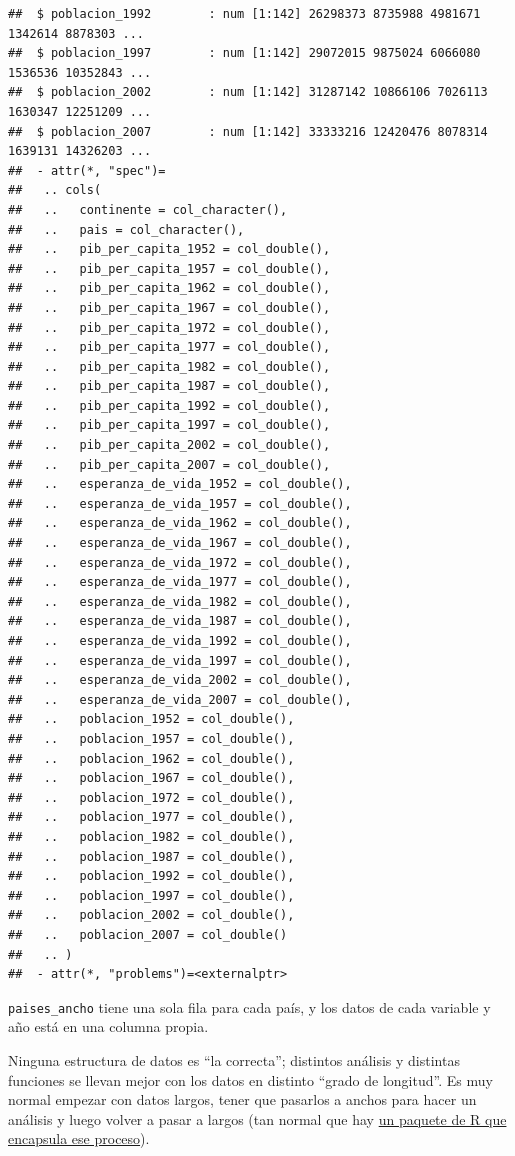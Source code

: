 \documentclass[
  openany]{book}
\begin{document}
\begin{verbatim}
##  $ poblacion_1992        : num [1:142] 26298373 8735988 4981671 1342614 8878303 ...
##  $ poblacion_1997        : num [1:142] 29072015 9875024 6066080 1536536 10352843 ...
##  $ poblacion_2002        : num [1:142] 31287142 10866106 7026113 1630347 12251209 ...
##  $ poblacion_2007        : num [1:142] 33333216 12420476 8078314 1639131 14326203 ...
##  - attr(*, "spec")=
##   .. cols(
##   ..   continente = col_character(),
##   ..   pais = col_character(),
##   ..   pib_per_capita_1952 = col_double(),
##   ..   pib_per_capita_1957 = col_double(),
##   ..   pib_per_capita_1962 = col_double(),
##   ..   pib_per_capita_1967 = col_double(),
##   ..   pib_per_capita_1972 = col_double(),
##   ..   pib_per_capita_1977 = col_double(),
##   ..   pib_per_capita_1982 = col_double(),
##   ..   pib_per_capita_1987 = col_double(),
##   ..   pib_per_capita_1992 = col_double(),
##   ..   pib_per_capita_1997 = col_double(),
##   ..   pib_per_capita_2002 = col_double(),
##   ..   pib_per_capita_2007 = col_double(),
##   ..   esperanza_de_vida_1952 = col_double(),
##   ..   esperanza_de_vida_1957 = col_double(),
##   ..   esperanza_de_vida_1962 = col_double(),
##   ..   esperanza_de_vida_1967 = col_double(),
##   ..   esperanza_de_vida_1972 = col_double(),
##   ..   esperanza_de_vida_1977 = col_double(),
##   ..   esperanza_de_vida_1982 = col_double(),
##   ..   esperanza_de_vida_1987 = col_double(),
##   ..   esperanza_de_vida_1992 = col_double(),
##   ..   esperanza_de_vida_1997 = col_double(),
##   ..   esperanza_de_vida_2002 = col_double(),
##   ..   esperanza_de_vida_2007 = col_double(),
##   ..   poblacion_1952 = col_double(),
##   ..   poblacion_1957 = col_double(),
##   ..   poblacion_1962 = col_double(),
##   ..   poblacion_1967 = col_double(),
##   ..   poblacion_1972 = col_double(),
##   ..   poblacion_1977 = col_double(),
##   ..   poblacion_1982 = col_double(),
##   ..   poblacion_1987 = col_double(),
##   ..   poblacion_1992 = col_double(),
##   ..   poblacion_1997 = col_double(),
##   ..   poblacion_2002 = col_double(),
##   ..   poblacion_2007 = col_double()
##   .. )
##  - attr(*, "problems")=<externalptr>
\end{verbatim}

\texttt{paises\_ancho} tiene una sola fila para cada país, y los datos de cada variable y año está en una columna propia.

Ninguna estructura de datos es ``la correcta''; distintos análisis y distintas funciones se llevan mejor con los datos en distinto ``grado de longitud''.
Es muy normal empezar con datos largos, tener que pasarlos a anchos para hacer un análisis y luego volver a pasar a largos (tan normal que hay \href{https://github.com/dgrtwo/widyr}{un paquete de R que encapsula ese proceso}).
\end{document}
